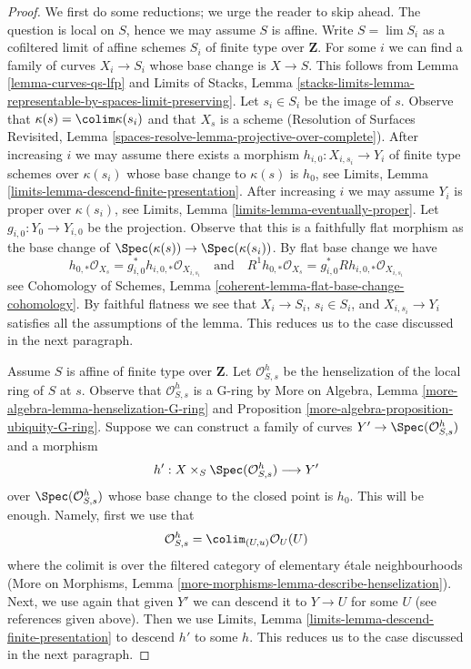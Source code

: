 \begin{proof}
We first do some reductions; we urge the reader to skip ahead.
The question is local on $S$, hence we may assume $S$ is affine.
Write $S = \lim S_i$ as a cofiltered limit of affine schemes $S_i$
of finite type over $\mathbf{Z}$.
For some $i$ we can find a family of curves $X_i \to S_i$
whose base change is $X \to S$. This follows from
Lemma \ref{lemma-curves-qs-lfp} and
Limits of Stacks, Lemma
\ref{stacks-limits-lemma-representable-by-spaces-limit-preserving}.
Let $s_i \in S_i$ be the image of $s$. Observe that
$\kappa(s) = \colim \kappa(s_i)$ and that $X_s$ is a scheme
(Resolution of Surfaces Revisited, Lemma
\ref{spaces-resolve-lemma-projective-over-complete}).
After increasing $i$ we may assume there exists a morphism
$h_{i, 0} : X_{i, s_i} \to Y_i$
of finite type schemes over $\kappa(s_i)$ whose base change to
$\kappa(s)$ is $h_0$, see
Limits, Lemma \ref{limits-lemma-descend-finite-presentation}.
After increasing $i$ we may assume $Y_i$ is proper over $\kappa(s_i)$, see
Limits, Lemma \ref{limits-lemma-eventually-proper}.
Let $g_{i, 0} : Y_0 \to Y_{i, 0}$ be the projection. Observe that
this is a faithfully flat morphism as the base change of
$\Spec(\kappa(s)) \to \Spec(\kappa(s_i))$.
By flat base change we have
$$
h_{0, *}\mathcal{O}_{X_s} = g_{i, 0}^*h_{i, 0, *}\mathcal{O}_{X_{i, s_i}}
\quad\text{and}\quad
R^1h_{0, *}\mathcal{O}_{X_s} = g_{i, 0}^*Rh_{i, 0, *}\mathcal{O}_{X_{i, s_i}}
$$
see Cohomology of Schemes, Lemma
\ref{coherent-lemma-flat-base-change-cohomology}.
By faithful flatness we see that $X_i \to S_i$, $s_i \in S_i$, and
$X_{i, s_i} \to Y_i$ satisfies all the assumptions of the lemma.
This reduces us to the case discussed in the next paragraph.

\medskip\noindent
Assume $S$ is affine of finite type over $\mathbf{Z}$.
Let $\mathcal{O}_{S, s}^h$ be the henselization of the local
ring of $S$ at $s$. Observe that $\mathcal{O}_{S, s}^h$ is a G-ring by
More on Algebra, Lemma \ref{more-algebra-lemma-henselization-G-ring} and
Proposition \ref{more-algebra-proposition-ubiquity-G-ring}.
Suppose we can construct a family of curves
$Y' \to \Spec(\mathcal{O}_{S, s}^h)$ and a morphism
$$
h' : X \times_S \Spec(\mathcal{O}_{S, s}^h) \longrightarrow Y'
$$
over $\Spec(\mathcal{O}_{S, s}^h)$ whose base change to the closed
point is $h_0$. This will be enough. Namely, first we use that
$$
\mathcal{O}_{S, s}^h = \colim_{(U, u)} \mathcal{O}_U(U)
$$
where the colimit is over the filtered category of 
elementary \'etale neighbourhoods (More on Morphisms, Lemma
\ref{more-morphisms-lemma-describe-henselization}).
Next, we use again that given $Y'$ we can descend it to
$Y \to U$ for some $U$ (see references given above).
Then we use
Limits, Lemma \ref{limits-lemma-descend-finite-presentation}
to descend $h'$ to some $h$. This reduces us to the case
discussed in the next paragraph.


\end{proof}
